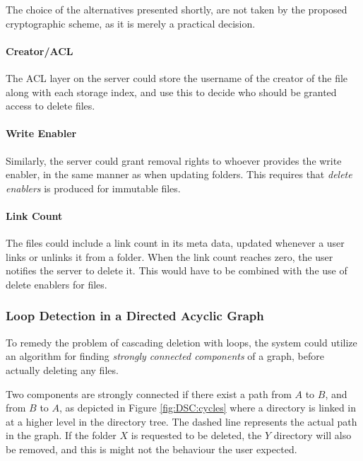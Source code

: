 \documentclass[pdftex,english,10pt,b5paper,twoside]{book}
\begin{document}
The choice of the alternatives presented shortly, are not taken by the proposed
cryptographic scheme, as it is merely a practical decision.

\paragraph{Creator/\ac{ACL}} The \ac{ACL} layer on the server could store the
username of the creator of the file along with each storage index, and use this
to decide who should be granted access to delete files.

\paragraph{Write Enabler} Similarly, the server could grant removal rights to
whoever provides the write enabler, in the same manner as when updating
folders. This requires that \emph{delete enablers} is produced for immutable
files.

\paragraph{Link Count} The files could include a link count in its meta data,
updated whenever a user links or unlinks it from a folder. When the link count
reaches zero, the user notifies the server to delete it. This would have to be
combined with the use of delete enablers for files.

\subsubsection{Loop Detection in a Directed Acyclic Graph}

To remedy the problem of cascading deletion with loops, the system could
utilize an algorithm for finding \emph{strongly connected components} of a
graph, before actually deleting any files.

Two components are strongly connected if there exist a path from $A$ to $B$,
and from $B$ to $A$, as depicted in Figure \ref{fig:DSC:cycles} where a
directory is linked in at a higher level in the directory tree. The dashed line
represents the actual path in the graph. If the folder $X$ is requested to be
deleted, the $Y$ directory will also be removed, and this is might not the
behaviour the user expected.
\end{document}
